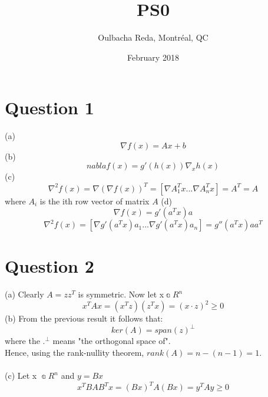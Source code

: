 \documentclass{article}
\title{PS0}
\author{Oulbacha Reda, Montréal, QC}
\date{February 2018}
\begin{document}
\maketitle

\section*{Question 1}
(a) $$\nabla f(x) = Ax + b$$ \n
(b) $$nabla f(x) = g'(h(x)) \nabla_x h(x)$$ \n  
(c) $$ \nabla^2 f(x) = \nabla(\nabla f(x))^T = [\nabla A_1^Tx ... \nabla A_n^Tx ]  = A^T = A $$ where $A_i$ is the ith row vector of matrix $A$ \newline
(d) $$\nabla f(x) = g'(a^Tx)a$$ \n
$$ \nabla^2 f(x) = [ \nabla g'(a^Tx)a_1 ... \nabla g'(a^Tx)a_n ] = g''(a^Tx)aa^T $$

\section*{Question 2}
(a) Clearly $A = zz^T$ is symmetric. Now let x\in$\Bbba R^n$ \n
$$x^TAx = (x^Tz)(z^Tx) = (x \cdot z)^2 \ge  0$$ \n
(b) From the previous result it follows that:
$$ker(A) = span(z)^\bot$$ where the $.^\bot$ means "the orthogonal space of". \n
\\ Hence, using the rank-nullity theorem, $rank(A) = n - (n-1) = 1 $.
\\
\\
(c) Let x \in $\Bbba R^n$ \n and $y=Bx$ 
$$x^TBAB^Tx = (Bx)^TA(Bx) = y^TAy\ge0$$
\end{document}
